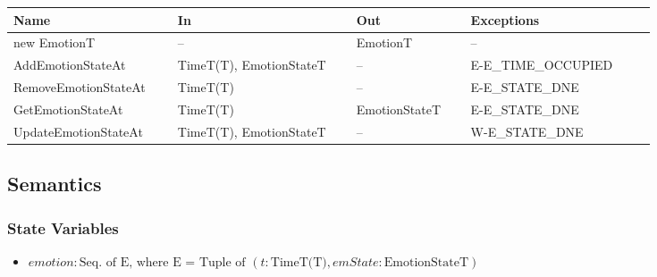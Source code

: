 \begin{center}
    \renewcommand{\arraystretch}{1.2}
    \begin{tabular}{m{0.23\linewidth} m{0.25\linewidth} m{0.16\linewidth}
            m{0.26\linewidth}}
        \toprule
        \textbf{Name} & \textbf{In} & \textbf{Out} & \textbf{Exceptions} \\
        \midrule

        \rowcolor[gray]{0.9}new EmotionT & -- & EmotionT & -- \\

        AddEmotionStateAt & TimeT(T), EmotionStateT & -- & E-E\_TIME\_OCCUPIED
        \\

        \rowcolor[gray]{0.9}RemoveEmotionStateAt & TimeT(T) & -- &
        E-E\_STATE\_DNE \\

        GetEmotionStateAt & TimeT(T) & EmotionStateT & E-E\_STATE\_DNE \\

        \rowcolor[gray]{0.9}UpdateEmotionStateAt & TimeT(T), EmotionStateT & --
        & W-E\_STATE\_DNE \\

        \bottomrule
    \end{tabular}
\end{center}

\subsection{Semantics}

\subsubsection{State Variables}

\begin{itemize}

    \item $\mathit{emotion} : \text{Seq. of E, where E = Tuple of } (t :
    \text{TimeT(T)}, \mathit{emState} : \text{EmotionStateT})$

\end{itemize}


